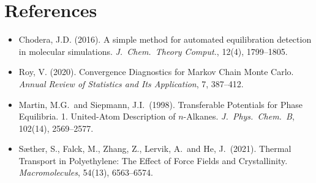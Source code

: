 \newpage
\section*{References}

\begin{itemize}
  \item Chodera, J.D. (2016). A simple method for automated equilibration
        detection in molecular simulations.
        \textit{J.\ Chem.\ Theory Comput.}, 12(4), 1799--1805.

  \item Roy, V. (2020). Convergence Diagnostics for Markov Chain Monte
        Carlo. \textit{Annual Review of Statistics and Its Application},
        7, 387--412.

  \item Martin, M.G.\ and Siepmann, J.I.\ (1998). Transferable Potentials
        for Phase Equilibria. 1. United-Atom Description of $n$-Alkanes.
        \textit{J.\ Phys.\ Chem.\ B}, 102(14), 2569--2577.
        
  \item Sæther, S., Falck, M., Zhang, Z., Lervik, A.\ and He, J.\ (2021).
        Thermal Transport in Polyethylene: The Effect of Force Fields and
        Crystallinity.
        \textit{Macromolecules}, 54(13), 6563--6574.
\end{itemize}